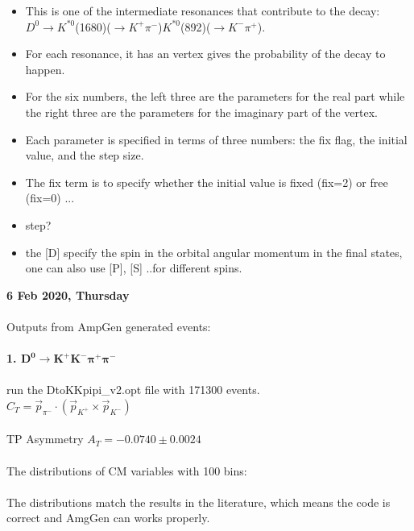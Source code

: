 \normalsize
\begin{itemize}
    \item This is one of the intermediate resonances that contribute to the decay: 
    \\
    $D^0\to K^{*0}$(1680)($\to K^+\pi^-$)$K^{*0}$(892)($\to K^-\pi^+$). 
    \item For each resonance, it has an vertex gives the probability of the decay to happen.
    \item For the six numbers, the left three are the parameters for the real part while the right three are the parameters for the imaginary part of the vertex.
    \item Each parameter is specified in terms of three numbers: the fix flag, the initial value, and the step size.
    \item The fix term is to specify whether the initial value is fixed (fix=2) or free (fix=0) ...
    \item step?
    \item the [D] specify the spin in the orbital angular momentum in the final states, one can also use [P], [S] ..for different spins.
\end{itemize}
\clearpage
\noindent\textbf{6 Feb 2020, Thursday}
\\
\\
Outputs from AmpGen generated events:
\\
\\
\textbf{1. $\bm{D^0\to K^+K^-\pi^+\pi^-}$}
\\
\\
\indent run the DtoKKpipi\_v2.opt file with 171300 events.
\\
\indent $C_T = \Vec{p}_{\pi^-}\cdot(\Vec{p}_{K^+} \times \Vec{p}_{K^-})$
\\
\\
TP Asymmetry $A_T = -0.0740\pm0.0024$
\\
\\
The distributions of CM variables with 100 bins:
\\
\\
The distributions match the results in the literature, which means the code is correct and AmgGen can works properly. 

